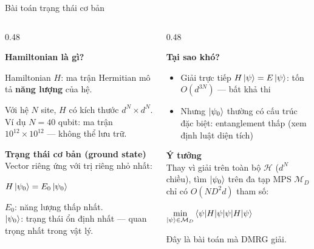 \documentclass[aspectratio=169, 11pt]{beamer}
\newcommand{\eqn}[1]{\begin{center}\colorbox{eqbox}{\color{qcyan}$\displaystyle #1$}\end{center}}
\begin{document}
\begin{frame}[shrink=3]{Bài toán trạng thái cơ bản}

\begin{columns}[T]
\begin{column}{0.48\textwidth}

\textcolor{qcyan}{\textbf{Hamiltonian là gì?}}\\[3pt]
{\small Hamiltonian $H$: ma trận Hermitian mô tả \textbf{năng lượng} của hệ.

\vspace{4pt}
Với hệ $N$ site, $H$ có kích thước $d^N \times d^N$. Ví dụ $N=40$ qubit: ma trận $10^{12} \times 10^{12}$ — không thể lưu trữ.}

\vspace{8pt}
\textcolor{qcyan}{\textbf{Trạng thái cơ bản (ground state)}}\\[3pt]
{\small Vector riêng ứng với trị riêng nhỏ nhất:}
\eqn{H\ket{\psi_0} = E_0\ket{\psi_0}}
{\small $E_0$: năng lượng thấp nhất.\\
$\ket{\psi_0}$: trạng thái ổn định nhất — quan trọng nhất trong vật lý.}

\end{column}
\begin{column}{0.48\textwidth}

\vspace{2pt}
\textcolor{qpurple}{\textbf{Tại sao khó?}}\\[3pt]
{\small
\begin{itemize}
  \item Giải trực tiếp $H\ket{\psi} = E\ket{\psi}$: tốn $O(d^{3N})$ — bất khả thi
  \item Nhưng $\ket{\psi_0}$ thường có cấu trúc đặc biệt: entanglement thấp (xem định luật diện tích)
\end{itemize}}

\vspace{8pt}
\textcolor{qamber}{\textbf{Ý tưởng}}\\[3pt]
{\small Thay vì giải trên toàn bộ $\mathcal{H}$ ($d^N$ chiều), tìm $\ket{\psi_0}$ trên đa tạp MPS $\mathcal{M}_D$ chỉ có $O(ND^2d)$ tham số:}
\eqn{\min_{\ket{\psi}\in\mathcal{M}_D} \braket{\psi|H|\psi}}
{\small Đây là bài toán mà DMRG giải.}

\end{column}
\end{columns}

\end{frame}
\end{document}

